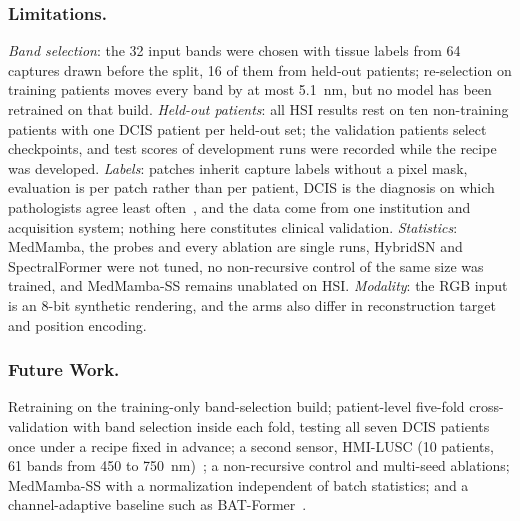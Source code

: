 \documentclass{svproc}
\begin{document}
\subsubsection{Limitations.}
\emph{Band selection}: the 32 input bands were chosen with tissue labels from 64 captures drawn before the split, 16 of them from held-out patients; re-selection on training patients moves every band by at most 5.1~nm, but no model has been retrained on that build. \emph{Held-out patients}: all HSI results rest on ten non-training patients with one DCIS patient per held-out set; the validation patients select checkpoints, and test scores of development runs were recorded while the recipe was developed. \emph{Labels}: patches inherit capture labels without a pixel mask, evaluation is per patch rather than per patient, DCIS is the diagnosis on which pathologists agree least often~\cite{elmore}, and the data come from one institution and acquisition system; nothing here constitutes clinical validation. \emph{Statistics}: MedMamba, the probes and every ablation are single runs, HybridSN and SpectralFormer were not tuned, no non-recursive control of the same size was trained, and MedMamba-SS remains unablated on HSI. \emph{Modality}: the RGB input is an 8-bit synthetic rendering, and the arms also differ in reconstruction target and position encoding.

\subsubsection{Future Work.}
Retraining on the training-only band-selection build; patient-level five-fold cross-validation with band selection inside each fold, testing all seven DCIS patients once under a recipe fixed in advance; a second sensor, HMI-LUSC (10 patients, 61 bands from 450 to 750~nm)~\cite{hmilusc}; a non-recursive control and multi-seed ablations; MedMamba-SS with a normalization independent of batch statistics; and a channel-adaptive baseline such as BAT-Former~\cite{batformer}.

\end{document}

